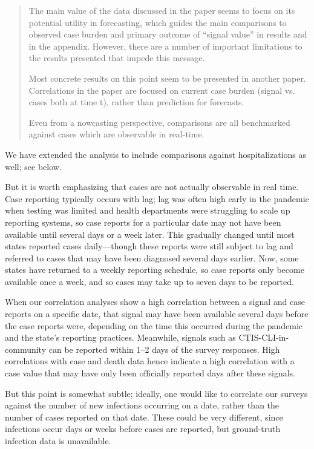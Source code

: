 \documentclass[11pt]{article}
\begin{document}
\begin{quote}
  The main value of the data discussed in the paper seems to focus on its
  potential utility in forecasting, which guides the main comparisons to
  observed case burden and primary outcome of ``signal value'' in results and in
  the appendix. However, there are a number of important limitations to the
  results presented that impede this message.

  Most concrete results on this point seem to be presented in another paper.
  Correlations in the paper are focused on current case burden (signal vs. cases
  both at time t), rather than prediction for forecasts.

  Even from a nowcasting perspective, comparisons are all benchmarked against
  cases which are observable in real-time.
\end{quote}
We have extended the analysis to include comparisons against hospitalizations as
well; see below.

But it is worth emphasizing that cases are not actually observable in real time.
Case reporting typically occurs with lag; lag was often high early in the
pandemic when testing was limited and health departments were struggling to
scale up reporting systems, so case reports for a particular date may not have
been available until several days or a week later. This gradually changed until
most states reported cases daily---though these reports were still subject to
lag and referred to cases that may have been diagnosed several days earlier.
Now, some states have returned to a weekly reporting schedule, so case reports
only become available once a week, and so cases may take up to seven days to be
reported.

When our correlation analyses show a high correlation between a signal and case
reports on a specific date, that signal may have been available several days
before the case reports were, depending on the time this occurred during the
pandemic and the state's reporting practices. Meanwhile, signals such as
CTIS-CLI-in-community can be reported within 1--2 days of the survey responses.
High correlations with case and death data hence indicate a high correlation
with a case value that may have only been officially reported days after these
signals.

But this point is somewhat subtle; ideally, one would like to correlate our
surveys against the number of new infections occurring on a date, rather than
the number of cases reported on that date. These could be very different, since
infections occur days or weeks before cases are reported, but ground-truth
infection data is unavailable.
\end{document}
